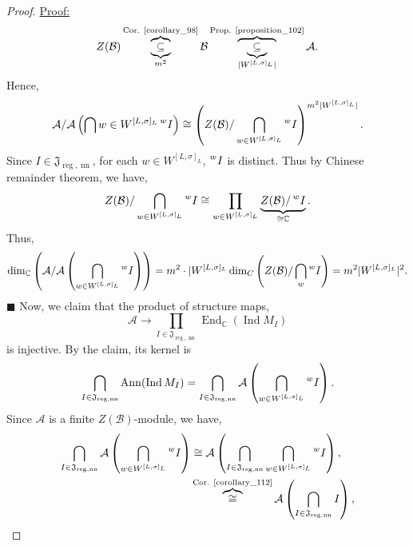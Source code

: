 \documentclass[8pt]{article}
\newenvironment{claimproof}[1]{\par\noindent\underline{Proof:}\space#1}{\hfill $\blacksquare$}
\DeclareMathOperator{\Ind}{Ind}
\DeclareMathOperator{\End}{End}
\DeclareMathOperator{\nn}{nn}
\DeclareMathOperator{\reg}{reg}
\DeclareMathOperator{\Ann}{Ann}
\newcommand{\C}[0]{\mathbb{C}}
\newcommand{\cA}{\mathcal{A}}
\newcommand{\cB}{\mathcal{B}}
\begin{document}
\begin{proof}
\begin{claimproof}
    \begin{equation*}
      Z(\cB)\overbrace{\underbrace{\subseteq}_{m^2}}^{\text{Cor. \ref{corollary_98}}}\cB\overbrace{\underbrace{\subseteq}_{\vert W^{[L,\sigma]_L}\vert}}^{\text{Prop. \ref{proposition_102}}}\cA.
    \end{equation*}
    Hence,
    \begin{equation*}
      \cA/\cA\left(\bigcap{w\in W^{[L,\sigma]_L}}\prescript{w}{}{I}\right)\cong \left(Z(\cB)/\bigcap_{w\in W^{[L,\sigma]_L}}\prescript{w}{}{I}\right)^{m^2\vert W^{[L,\sigma]_L}\vert}.
    \end{equation*}
    Since $I\in\mathfrak{J}_{\reg,\nn}$, for each $w\in W^{[L,\sigma]_L}$, $\prescript{w}{}{I}$ is distinct. Thus by Chinese remainder theorem, we have,
    \begin{equation*}
      Z(\cB)/\bigcap_{w\in W^{[L,\sigma]_L}}\prescript{w}{}{I}\cong \prod_{w\in W^{[L,\sigma]_L}}\underbrace{Z(\cB)/\prescript{w}{}{I}}_{\cong \C}.
    \end{equation*}
    Thus,
    \begin{equation*}
      \dim_\C\left(\cA/\cA\left(\bigcap_{w\in W^{[L,\sigma]_L}}\prescript{w}{}{I}\right)\right) = m^2\cdot\vert W^{[L,\sigma]_L}\dim_C\left(Z(\cB)/\bigcap_{w}\prescript{w}{}{I}\right)=m^2\vert W^{[L,\sigma]_L}\vert^2.
    \end{equation*}
  \end{claimproof}
  Now, we claim that the product of structure maps,
  \begin{equation*}
    \cA\to\prod_{I\in\mathfrak{J}_{\reg,\nn}}\End_\C(\Ind M_I)
  \end{equation*}
  is injective. By the claim, its kernel is 
  \begin{equation*}
    \bigcap_{I\in\mathfrak{J}_{\reg,\nn}}\Ann(\Ind M_I)=\bigcap_{I\in\mathfrak{J}_{\reg,\nn}}\cA\left(\bigcap_{w\in W^{[L,\sigma]_L}}\prescript{w}{}{I}\right).
  \end{equation*}
  Since $\cA$ is a finite $Z(\cB)$-module, we have,
  \begin{align*}
    \bigcap_{I\in\mathfrak{J}_{\reg,\nn}}\cA\left(\bigcap_{w\in W^{[L,\sigma]_L}}\prescript{w}{}{I}\right) &\cong \cA\left(\bigcap_{I\in \mathfrak{J}_{\reg,\nn}}\bigcap_{w\in W^{[L,\sigma]_L}}\prescript{w}{}{I}\right),\\
    & \overbrace{\cong}^{\text{Cor. \ref{corollary_112}}}\cA\left(\bigcap_{I\in\mathfrak{J}_{\reg,\nn}}I\right),\\

\end{align*}
\end{proof}
\end{document}
